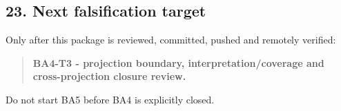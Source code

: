 \documentclass[11pt,a4paper]{article}
\begin{document}
\subsection{23. Next falsification
target}\label{23-next-falsification-target}

Only after this package is reviewed, committed, pushed and remotely
verified:

\begin{quote}
\textbf{BA4-T3 - projection boundary, interpretation/coverage and
cross-projection closure review.}
\end{quote}

Do not start BA5 before BA4 is explicitly closed.
\end{document}
